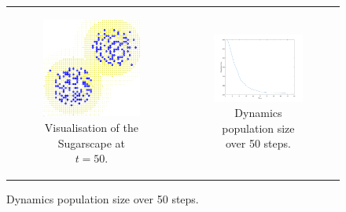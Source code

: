\begin{figure}
\begin{center}
	\begin{tabular}{c c}
		\begin{subfigure}[b]{0.4\textwidth}
			\centering
			\includegraphics[width=1\textwidth, angle=0]{./fig/sugarscape/vis/sugarscape_t60_environment.png}
			\caption{Visualisation of the Sugarscape at $t = 50$.}
			\label{fig:vis_sugarscape_t50_environment}
		\end{subfigure}
    	
    	&
  
		\begin{subfigure}[b]{0.6\textwidth}
			\centering
			\includegraphics[width=1\textwidth, angle=0]{./fig/sugarscape/vis/sugarscape_t60_dynamics.png}
			\caption{Dynamics population size over 50 steps.}
			\label{fig:vis_sugarscape_t50_dynamics}
		\end{subfigure}
	\end{tabular}
	

\end{center}
\end{figure}
